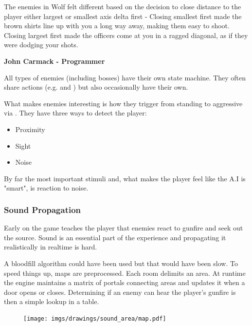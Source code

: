\begin{fancyquotes}
The enemies in Wolf felt different based on the decision to close distance to the player either largest or smallest axis delta first - Closing smallest first made the brown shirts line up with you a long way away, making them easy to shoot.  Closing largest first made the officers come at you in a ragged diagonal, as if they were dodging your shots.\\
\par
\textbf{John Carmack - Programmer}
 \end{fancyquotes}
\par
All types of enemies (including bosses) have their own state machine. They often share actions (e.g.  and ) but also occasionally have their own.\\
\par
What makes enemies interesting is how they trigger from standing to aggressive via . They have three ways to detect the player:
\begin{itemize}
\item Proximity
\item Sight
\item Noise
\end{itemize}
By far the most important stimuli and, what makes the player feel like the A.I is "smart", is reaction to noise.





\subsubsection{Sound Propagation}
Early on the game teaches the player that enemies react to gunfire and seek out the source. Sound is an essential part of the experience and propagating it realistically in realtime is hard.\\
\par
 A bloodfill algorithm could have been used but that would have been slow. To speed things up, maps are preprocessed. Each room delimits an area. At runtime the engine maintains a matrix of portals connecting areas and updates it when a door opens or closes. Determining if an enemy can hear the player's gunfire is then a simple lookup in a table.

\par
\begin{figure}[H]
 \centering
 \texttt{[image: imgs/drawings/sound\_area/map.pdf]}
 
\end{figure}

